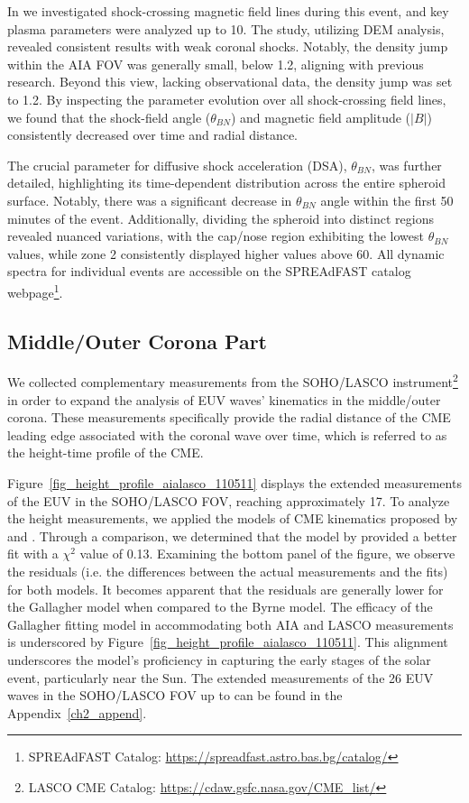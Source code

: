 In \citet{kozarev_2022} we investigated shock-crossing magnetic field lines during this event, and key plasma parameters were analyzed up to 10\rsun. The study, utilizing DEM analysis, revealed consistent results with weak coronal shocks. Notably, the density jump within the AIA FOV was generally small, below 1.2, aligning with previous research. Beyond this view, lacking observational data, the density jump was set to 1.2.
By inspecting the parameter evolution over all shock-crossing field lines, we found that the shock-field angle ($\theta_{BN}$) and magnetic field amplitude ($|B|$) consistently decreased over time and radial distance.

The crucial parameter for diffusive shock acceleration (DSA), $\theta_{BN}$, was further detailed, highlighting its time-dependent distribution across the entire spheroid surface. Notably, there was a significant decrease in $\theta_{BN}$ angle within the first 50 minutes of the event. Additionally, dividing the spheroid into distinct regions revealed nuanced variations, with the cap/nose region exhibiting the lowest $\theta_{BN}$ values, while zone 2 consistently displayed higher values above 60\degree. All dynamic spectra for individual events are accessible on the SPREAdFAST catalog webpage\footnote{SPREAdFAST Catalog: \url{https://spreadfast.astro.bas.bg/catalog/}}.

\subsection{Middle/Outer Corona Part}
We collected complementary measurements from the SOHO/LASCO instrument\footnote{LASCO CME Catalog: \url{https://cdaw.gsfc.nasa.gov/CME_list/}} in order to expand the analysis of EUV waves' kinematics in the middle/outer corona. These measurements specifically provide the radial distance of the CME leading edge associated with the coronal wave over time, which is referred to as the height-time profile of the CME.

Figure~\ref{fig_height_profile_aialasco_110511} displays the extended measurements of the EUV in the SOHO/LASCO FOV, reaching approximately 17\rsun. To analyze the height measurements, we applied the models of CME kinematics proposed by \citet{gallagher_2003} and \citet{byrne_2013}. Through a comparison, we determined that the model by \citet{gallagher_2003} provided a better fit with a $\chi^2$ value of 0.13. Examining the bottom panel of the figure, we observe the residuals (i.e. the differences between the actual measurements and the fits) for both models. It becomes apparent that the residuals are generally lower for the Gallagher model when compared to the Byrne model.
The efficacy of the Gallagher fitting model in accommodating both AIA and LASCO measurements is underscored by Figure~\ref{fig_height_profile_aialasco_110511}. This alignment underscores the model's proficiency in capturing the early stages of the solar event, particularly near the Sun. The extended measurements of the 26 EUV waves in the SOHO/LASCO FOV up to  \rsun can be found in the Appendix~\ref{ch2_append}.

